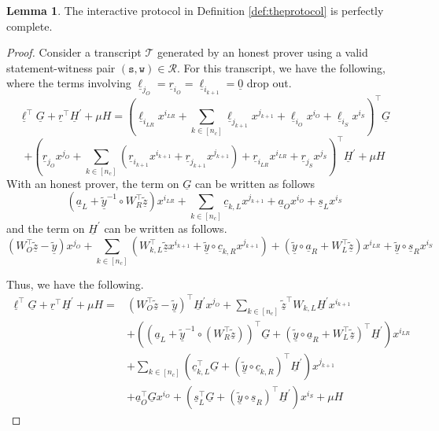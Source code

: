 \documentclass{article}
\theoremstyle{definition}
\newtheorem{lemma}[theorem]{Lemma}
\newcommand{\zq}{\widetilde{\underline{z}}}
\newcommand{\yq}{\widetilde{\underline{y}}}
\begin{document}
\begin{lemma}
The interactive protocol in Definition \ref{def:theprotocol} is perfectly complete.
\end{lemma}
\begin{proof}
Consider a transcript $\mathcal{T}$ generated by an honest prover using a valid statement-witness pair $(\texttt{s}, \texttt{w}) \in \mathcal{R}$. For this transcript, we have the following, where the terms involving $\underline{\ell}_{j_O} = \underline{r}_{i_O} = \underline{\ell}_{i_{k+1}} = \underline{0}$ drop out.
$$\underline{\ell}^\top \underline{G} +\underline{r}^\top \underline{H}^\prime + \mu H 
= \left(\underline{\ell}_{i_{LR}} x^{i_{LR}} + \sum_{k \in [n_c]} \underline{\ell}_{j_{k+1}} x^{j_{k+1}} + \underline{\ell}_{i_O} x^{i_O} + \underline{\ell}_{i_S} x^{i_S}\right)^\top \underline{G}$$
$$+\left(\underline{r}_{j_O} x^{j_O} + \sum_{k \in [n_c]} \left(\underline{r}_{i_{k+1}} x^{i_{k+1}} + \underline{r}_{j_{k+1}} x^{j_{k+1}}\right) + \underline{r}_{i_{LR}} x^{i_{LR}} + \underline{r}_{j_S} x^{j_S}\right)^\top \underline{H}^\prime + \mu H$$
With an honest prover, the term on $\underline{G}$ can be written as follows
$$\left(\underline{a}_L + \yq^{-1} \circ W^\top_R \zq\right)x^{i_{LR}} + \sum_{k \in [n_c]} \underline{c}_{k,L} x^{j_{k+1}} + \underline{a}_O x^{i_O} + \underline{s}_L x^{i_S}$$
and the term on $\underline{H}^\prime$ can be written as follows.
$$(W^\top_O \zq - \yq)x^{j_O} + \sum_{k \in [n_c]} (W^\top_{k,L} \zq x^{i_{k+1}} + \yq \circ \underline{c}_{k,R} x^{j_{k+1}}) + (\yq \circ \underline{a}_R + W_L^\top \zq)x^{i_{LR}} + \yq \circ \underline{s}_R x^{i_S}$$

Thus, we have the following.
\begin{align*}
\underline{\ell}^\top \underline{G} + \underline{r}^\top \underline{H}^\prime + \mu H = & (W^\top_O \zq - \yq)^\top \underline{H}^\prime x^{j_O}  + \sum_{k \in [n_c]} \zq^\top W_{k,L} \underline{H}^\prime x^{i_{k+1}} \\
& + \left(\left(\underline{a}_L + \yq^{-1} \circ(W_R^\top\zq)\right)^\top \underline{G} + \left(\yq \circ \underline{a}_R + W_L^\top \zq\right)^\top \underline{H}^\prime\right)x^{i_{LR}} \\
&+ \sum_{k \in [n_c]} \left(\underline{c}_{k,L}^\top \underline{G} + \left(\yq \circ \underline{c}_{k,R}\right)^\top \underline{H}^\prime\right)x^{j_{k+1}} \\
& + \underline{a}_O^\top \underline{G} x^{i_O} + (\underline{s}_L^\top \underline{G} + (\yq \circ \underline{s}_R)^\top \underline{H}^\prime) x^{i_S} + \mu H
\end{align*}


\end{proof}
\end{document}
